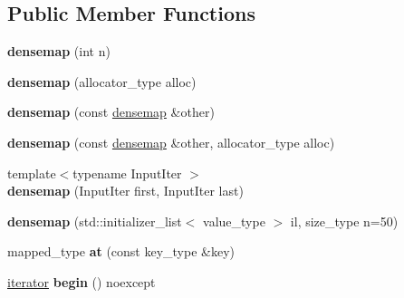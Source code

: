 \subsection*{Public Member Functions}
\begin{DoxyCompactItemize}
\item 
\mbox{\label{classtheoria_1_1util_1_1densemap_a28dea7cc32d7cee72cf330bdf3e3201c}} 
{\bfseries densemap} (int n)
\item 
\mbox{\label{classtheoria_1_1util_1_1densemap_a4c32897f404f44c7de730637d09e18d5}} 
{\bfseries densemap} (allocator\+\_\+type alloc)
\item 
\mbox{\label{classtheoria_1_1util_1_1densemap_a8c6d546ba72e0516685424cb5c4c2467}} 
{\bfseries densemap} (const \hyperlink{classtheoria_1_1util_1_1densemap}{densemap} \&other)
\item 
\mbox{\label{classtheoria_1_1util_1_1densemap_ae8cbc01dc2418bffff40319a80df81e7}} 
{\bfseries densemap} (const \hyperlink{classtheoria_1_1util_1_1densemap}{densemap} \&other, allocator\+\_\+type alloc)
\item 
\mbox{\label{classtheoria_1_1util_1_1densemap_abd0a8736cb03cb0e4bbc7489a5274c78}} 
{\footnotesize template$<$typename Input\+Iter $>$ }\\{\bfseries densemap} (Input\+Iter first, Input\+Iter last)
\item 
\mbox{\label{classtheoria_1_1util_1_1densemap_a2fbff5aaf475fbd8492c9c766614517b}} 
{\bfseries densemap} (std\+::initializer\+\_\+list$<$ value\+\_\+type $>$ il, size\+\_\+type n=50)
\item 
\mbox{\label{classtheoria_1_1util_1_1densemap_a8205a6321acfcf7492c71c4912c348df}} 
mapped\+\_\+type {\bfseries at} (const key\+\_\+type \&key)
\item 
\mbox{\label{classtheoria_1_1util_1_1densemap_a511286991ffa72b606d52ae74668d5fe}} 
\hyperlink{classtheoria_1_1util_1_1densemap_1_1Iter}{iterator} {\bfseries begin} () noexcept

\end{DoxyCompactItemize}
